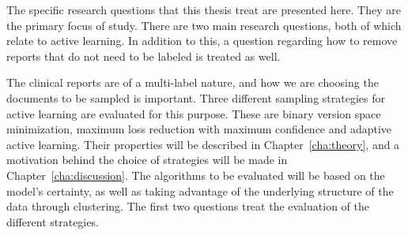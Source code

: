 The specific research questions that this thesis treat are presented here.
They are the primary focus of study.
There are two main research questions, both of which relate to active learning.
In addition to this, a question regarding how to remove reports that do not need to be labeled is treated as well.

The clinical reports are of a multi-label nature, and how we are choosing the documents to be sampled is important.
Three different sampling strategies for active learning are evaluated for this purpose.
These are binary version space minimization, maximum loss reduction with maximum confidence and adaptive active learning.
Their properties will be described in Chapter~\ref{cha:theory}, and a motivation behind the choice of strategies will be made in Chapter~\ref{cha:discussion}.
The algorithms to be evaluated will be based on the model's certainty, as well as taking advantage of the underlying structure of the data through clustering.
The first two questions treat the evaluation of the different strategies.

